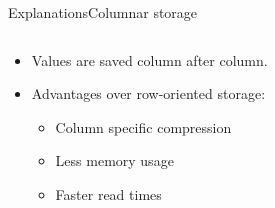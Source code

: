 \begin{frame}[t]{Explanations}{Columnar storage}
	\begin{columns}[t]
		\begin{column}[t]{0.4\linewidth}
			\begin{itemize}
				\item Values are saved column after column\footnotemark.
				\item<2-> Advantages over row-oriented storage:
				      \begin{itemize}
					      \item Column specific compression\footnotemark
					      \item Less memory usage\footnotemark[2]
					      \item Faster read times\footnotemark[1]
				      \end{itemize}


\end{itemize}
\end{column}
\end{columns}
\end{frame}
